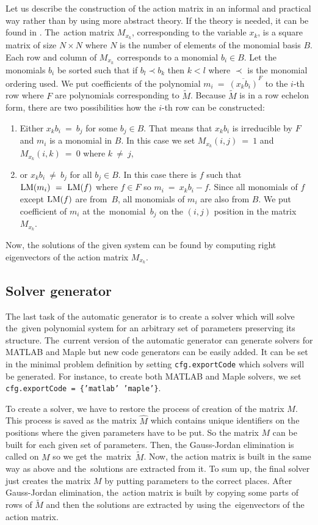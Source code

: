 Let us describe the construction of the action matrix in an informal and practical way rather than by using more abstract theory. If the theory is needed, it can be found in \cite{KukelovaAlgMethods}. The~action matrix $M_{x_k}$, corresponding to the variable $x_k$, is a square matrix of size $N \times N$ where $N$ is the number of elements of the monomial basis $B$. Each row and column of $M_{x_k}$ corresponds to a monomial $b_i \in B$. Let the monomials $b_i$ be sorted such that if $b_l \prec b_k$ then $k < l$ where $\prec$ is the monomial ordering used. We put coefficients of the polynomial $m_i\ =\ \overline{(x_k b_i)}^F$ to the $i$-th row where $F$ are polynomials corresponding to $\tilde{M}$. Because $\tilde{M}$ is in a row echelon form, there are two possibilities how the $i$-th row can be constructed:
\begin{enumerate}
  \item Either $x_k b_i\ =\ b_j$ for some $b_j \in B$. That means that $x_k b_i$ is irreducible by $F$ and $m_i$ is a monomial in $B$. In this case we set $M_{x_k}(i, j)\ =\ 1$ and $M_{x_k}(i, k)\ =\ 0$ where $k\ \neq\ j$,\\
  \item or $x_k b_i\ \neq\ b_j$ for all $b_j \in B$. In this case there is $f$ such that $\operatorname{LM}(m_i)\ =\ \operatorname{LM}(f)$ where $f \in F$ so $m_i\ =\ x_k b_i - f$. Since all monomials of $f$ except $\operatorname{LM}(f)$ are from~$B$, all monomials of $m_i$ are also from $B$. We put coefficient of $m_i$ at the~monomial~$b_j$ on the $(i, j)$ position in the matrix $M_{x_k}$.
\end{enumerate}

Now, the solutions of the given system can be found by computing right eigenvectors of the action matrix $M_{x_k}$.

\subsection{Solver generator}
The last task of the automatic generator is to create a solver which will solve the~given polynomial system for an arbitrary set of parameters preserving its structure. The~current version of the automatic generator can generate solvers for MATLAB and Maple but new code generators can be easily added. It can be set in the minimal problem definition by setting \texttt{cfg.exportCode} which solvers will be generated. For instance, to create both MATLAB and Maple solvers, we set \texttt{cfg.exportCode = \{'matlab' 'maple'\}}.

To create a solver, we have to restore the process of creation of the matrix $M$. This process is saved as the matrix $\hat{M}$ which contains unique identifiers on the positions where the given parameters have to be put. So the matrix $M$ can be built for each given set of parameters. Then, the Gauss-Jordan elimination is called on $M$ so we get the~matrix~$\tilde{M}$. Now, the action matrix is built in the same way as above and the~solutions are extracted from it. To sum up, the final solver just creates the matrix $M$ by putting parameters to the correct places. After Gauss-Jordan elimination, the~action matrix is built by copying some parts of rows of $\tilde{M}$ and then the solutions are extracted by using the~eigenvectors of the action matrix.

